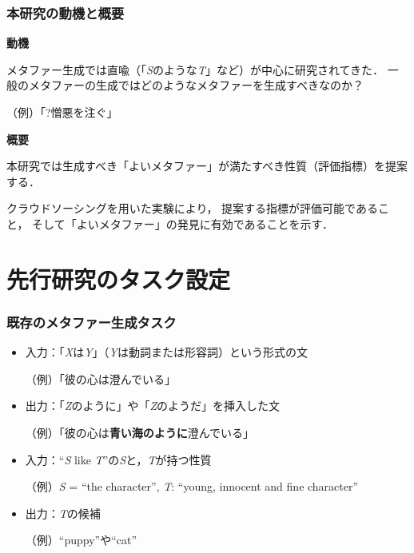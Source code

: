 \documentclass[12pt,usepdftitle=false]{beamer}
\begin{document}
\begin{frame}
    \frametitle{本研究の動機と概要}

    \textbf{動機}

    メタファー生成では直喩（「\emph{S}のような\emph{T}」など）が中心に研究されてきた．
    一般のメタファーの生成ではどのようなメタファーを生成すべきなのか？

    （例）「?憎悪を注ぐ」

    \bigskip

    \textbf{概要}

    本研究では生成すべき「よいメタファー」が満たすべき性質（評価指標）を提案する．

    \bigskip

    クラウドソーシングを用いた実験により，
    提案する指標が評価可能であること，
    そして「よいメタファー」の発見に有効であることを示す．

\end{frame}

\section{先行研究のタスク設定}
\begin{frame}
    \frametitle{既存のメタファー生成タスク}

    \cite{jakitada2001}
    \addtolength{\leftmargini}{-1\zw}
    \begin{itemize}
        \item 入力：「\emph{X}は\emph{Y}」（\emph{Y}は動詞または形容詞）という形式の文

            （例）「彼の心は澄んでいる」

        \item 出力：「\emph{Z}のように」や「\emph{Z}のようだ」を挿入した文

            （例）「彼の心は\textbf{青い海のように}澄んでいる」

    \end{itemize}

    \bigskip

    \citet{abe2006}

    \begin{itemize}

        \item 入力：``\emph{S} like \emph{T}''の\emph{S}と，\emph{T}が持つ性質

            （例）\emph{S} = ``the character'',\newline
             \hspace{2.5\zw}\emph{T}: ``young, innocent and fine character''

        \item 出力：\emph{T}の候補

            （例）``puppy''や``cat''

    \end{itemize}
\end{frame}
\end{document}
